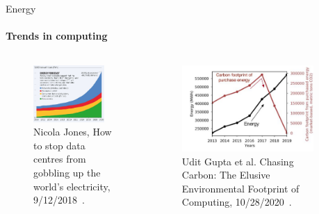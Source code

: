 \documentclass[notes=only,10pt,xcolor=table]{beamer}
\begin{document}
\begin{frame}{Energy}
\framesubtitle{Trends in computing}
\begin{columns}
    \begin{column}{.5\textwidth}
        \begin{figure}
            \includegraphics[width=0.9\textwidth]{img/energyuse1.pdf}
            \caption{Nicola Jones, How to stop data centres from gobbling up the world’s electricity, 9/12/2018~\cite{nature1}.}
        \end{figure}
    \end{column}
    \begin{column}{.5\textwidth}
        \begin{figure}
            \includegraphics[width=0.9\textwidth]{img/energyuse2.pdf}
            \caption{Udit Gupta et al. Chasing Carbon: The Elusive Environmental Footprint of Computing, 10/28/2020~\cite{gupta2020chasing}.}
        \end{figure}
    \end{column}
    \end{columns}
\end{frame}
\end{document}
